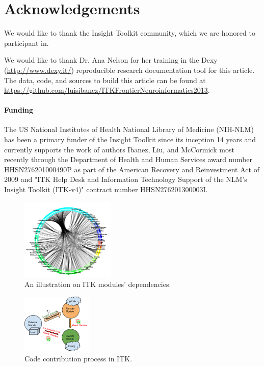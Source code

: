 \documentclass{frontiersENG} %
\begin{document}
\section*{Acknowledgements}

We would like to thank the Insight Toolkit community, which we are honored to
participant in.

We would like to thank Dr. Ana Nelson for her training in the Dexy
(\url{http://www.dexy.it/}) reproducible research documentation tool for this
article.  The data, code, and sources to build this article can be found at
\url{https://github.com/luisibanez/ITKFrontierNeuroinformatics2013}.

\paragraph{Funding\textcolon} The US National Institutes of Health National
Library of Medicine (NIH-NLM) has been a primary funder of the Insight Toolkit since
its inception 14 years and currently supports the work of authors Ibanez, Liu,
and McCormick most recently through the Department of Health and Human
Services award number HHSN276201000490P as part of the American Recovery and
Reinvestment Act of 2009 and "ITK Help Desk and Information Technology Support
of the NLM's Insight Toolkit (ITK-v4)" contract number HHSN276201300003I.


\begin{figure}
  \centering
    \includegraphics[width=0.4\textwidth]{itk_module_dependency.png}
    \caption{ An illustration on ITK modules' dependencies.}
    \label{fig:itk_module_dependency}
\end{figure}

\begin{figure}
  \centering
    \includegraphics[width=0.3\textwidth]{itk_code_contribution.png}
    \caption{ Code contribution process in ITK.}
    \label{fig:itk_code_contribution}
\end{figure}
\end{document}
